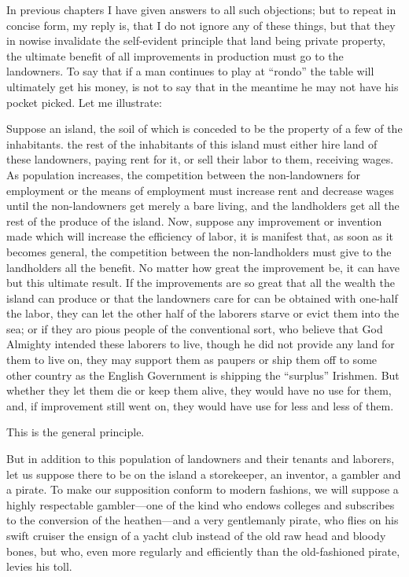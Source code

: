 \documentclass{book}
\begin{document}
In previous chapters I have given answers to all such objections; but to repeat in concise form, my reply is, that I do not ignore any of these things, but that they in nowise invalidate the self-evident principle that land being private property, the ultimate benefit of all improvements in production must go to the landowners. To say that if a man continues to play at “rondo” the table will ultimately get his money, is not to say that in the meantime he may not have his pocket picked. Let me illustrate:

Suppose an island, the soil of which is conceded to be the property of a few of the inhabitants. the rest of the inhabitants of this island must either hire land of these landowners, paying rent for it, or sell their labor to them, receiving wages. As population increases, the competition between the non-landowners for employment or the means of employment must increase rent and decrease wages until the non-landowners get merely a bare living, and the landholders get all the rest of the produce of the island. Now, suppose any improvement or invention made which will increase the efficiency of labor, it is manifest that, as soon as it becomes general, the competition between the non-landholders must give to the landholders all the benefit. No matter how great the improvement be, it can have but this ultimate result. If the improvements are so great that all the wealth the island can produce or that the landowners care for can be obtained with one-half the labor, they can let the other half of the laborers starve or evict them into the sea; or if they aro pious people of the conventional sort, who believe that God Almighty intended these laborers to live, though he did not provide any land for them to live on, they may support them as paupers or ship them off to some other country as the English Government is shipping the “surplus” Irishmen. But whether they let them die or keep them alive, they would have no use for them, and, if improvement still went on, they would have use for less and less of them.

This is the general principle.

But in addition to this population of landowners and their tenants and laborers, let us suppose there to be on the island a storekeeper, an inventor, a gambler and a pirate. To make our supposition conform to modern fashions, we will suppose a highly respectable gambler—one of the kind who endows colleges and subscribes to the conversion of the heathen—and a very gentlemanly pirate, who flies on his swift cruiser the ensign of a yacht club instead of the old raw head and bloody bones, but who, even more regularly and efficiently than the old-fashioned pirate, levies his toll.
\end{document}
